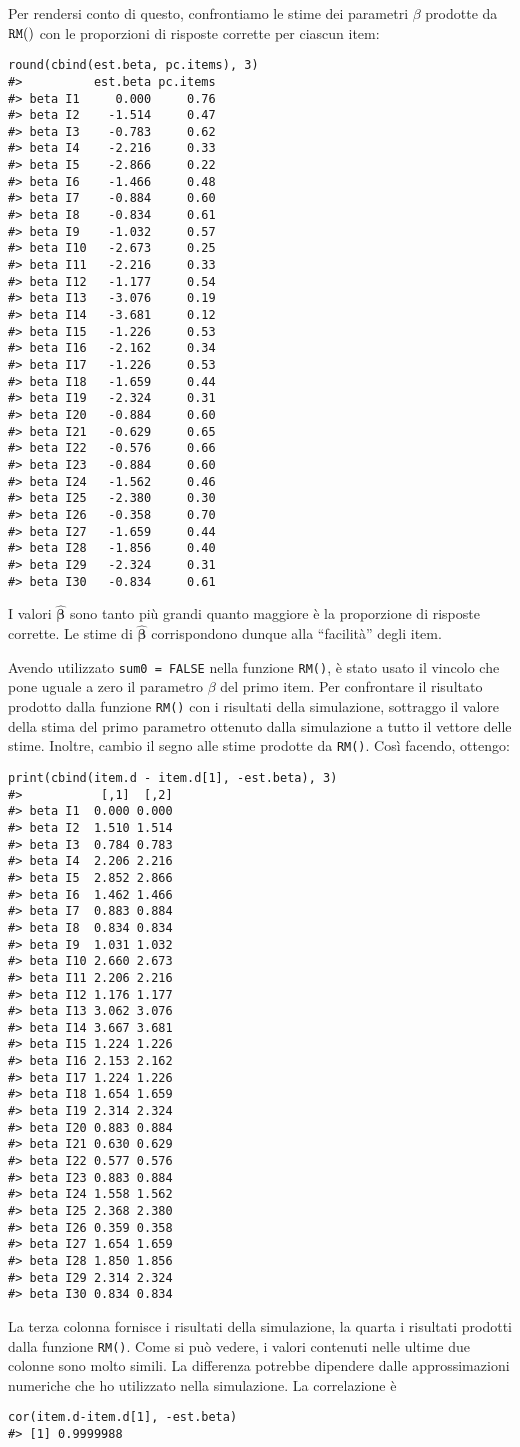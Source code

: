Per rendersi conto di questo, confrontiamo le stime dei parametri $\beta$ prodotte da $\tt RM()$ con le proporzioni di risposte corrette per ciascun item:
\begin{lstlisting}
round(cbind(est.beta, pc.items), 3)
#>          est.beta pc.items
#> beta I1     0.000     0.76
#> beta I2    -1.514     0.47
#> beta I3    -0.783     0.62
#> beta I4    -2.216     0.33
#> beta I5    -2.866     0.22
#> beta I6    -1.466     0.48
#> beta I7    -0.884     0.60
#> beta I8    -0.834     0.61
#> beta I9    -1.032     0.57
#> beta I10   -2.673     0.25
#> beta I11   -2.216     0.33
#> beta I12   -1.177     0.54
#> beta I13   -3.076     0.19
#> beta I14   -3.681     0.12
#> beta I15   -1.226     0.53
#> beta I16   -2.162     0.34
#> beta I17   -1.226     0.53
#> beta I18   -1.659     0.44
#> beta I19   -2.324     0.31
#> beta I20   -0.884     0.60
#> beta I21   -0.629     0.65
#> beta I22   -0.576     0.66
#> beta I23   -0.884     0.60
#> beta I24   -1.562     0.46
#> beta I25   -2.380     0.30
#> beta I26   -0.358     0.70
#> beta I27   -1.659     0.44
#> beta I28   -1.856     0.40
#> beta I29   -2.324     0.31
#> beta I30   -0.834     0.61
\end{lstlisting} 
I valori $\hat{\boldsymbol{\beta}}$ sono tanto più grandi quanto maggiore è la proporzione di risposte corrette.  Le stime di $\hat{\boldsymbol{\beta}}$ corrispondono dunque alla ``facilità'' degli item.

Avendo utilizzato {\tt sum0 = FALSE} nella funzione {\tt RM()}, è stato usato il vincolo che pone uguale a zero il parametro $\beta$ del primo item. Per confrontare il risultato prodotto dalla funzione {\tt RM()} con i risultati della simulazione, sottraggo il valore della stima del primo parametro ottenuto dalla simulazione a tutto il vettore delle stime.  Inoltre, cambio il segno alle stime prodotte da {\tt RM()}.  Così facendo, ottengo:
\begin{lstlisting}
print(cbind(item.d - item.d[1], -est.beta), 3)
#>           [,1]  [,2]
#> beta I1  0.000 0.000
#> beta I2  1.510 1.514
#> beta I3  0.784 0.783
#> beta I4  2.206 2.216
#> beta I5  2.852 2.866
#> beta I6  1.462 1.466
#> beta I7  0.883 0.884
#> beta I8  0.834 0.834
#> beta I9  1.031 1.032
#> beta I10 2.660 2.673
#> beta I11 2.206 2.216
#> beta I12 1.176 1.177
#> beta I13 3.062 3.076
#> beta I14 3.667 3.681
#> beta I15 1.224 1.226
#> beta I16 2.153 2.162
#> beta I17 1.224 1.226
#> beta I18 1.654 1.659
#> beta I19 2.314 2.324
#> beta I20 0.883 0.884
#> beta I21 0.630 0.629
#> beta I22 0.577 0.576
#> beta I23 0.883 0.884
#> beta I24 1.558 1.562
#> beta I25 2.368 2.380
#> beta I26 0.359 0.358
#> beta I27 1.654 1.659
#> beta I28 1.850 1.856
#> beta I29 2.314 2.324
#> beta I30 0.834 0.834
\end{lstlisting} 
La terza colonna fornisce i risultati della simulazione, la quarta i risultati prodotti dalla funzione {\tt RM()}. Come si può vedere, i valori contenuti nelle ultime due colonne sono molto simili. La differenza potrebbe dipendere dalle approssimazioni numeriche che ho utilizzato nella simulazione. La correlazione è
\begin{lstlisting}
cor(item.d-item.d[1], -est.beta)
#> [1] 0.9999988
\end{lstlisting} 

